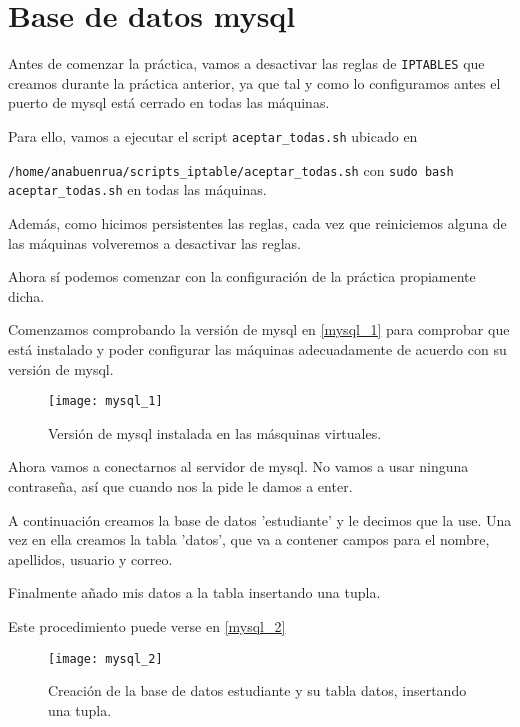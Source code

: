 
\chapter{Base de datos mysql}

Antes de comenzar la práctica, vamos a desactivar las reglas de \verb|IPTABLES| que creamos durante la práctica anterior, ya que tal y como lo configuramos antes el puerto de mysql está cerrado en todas las máquinas.

Para ello, vamos a ejecutar el script \verb|aceptar_todas.sh| ubicado en 

\verb|/home/anabuenrua/scripts_iptable/aceptar_todas.sh| con \verb|sudo bash aceptar_todas.sh| en todas las máquinas.

Además, como hicimos persistentes las reglas, cada vez que reiniciemos alguna de las máquinas volveremos a desactivar las reglas.

Ahora sí podemos comenzar con la configuración de la práctica propiamente dicha.

Comenzamos comprobando la versión de mysql en \eqref{mysql_1} para comprobar que está instalado y poder configurar las máquinas adecuadamente de acuerdo con su versión de mysql.

\begin{figure}[h!]
\begin{center}
\caption{Versión de mysql instalada en las másquinas virtuales.}
\label{mysql_1}
\texttt{[image: mysql\_1]}
\end{center}
\end{figure}

Ahora vamos a conectarnos al servidor de mysql. No vamos a usar ninguna contraseña, así que cuando nos la pide le damos a enter.

A continuación creamos la base de datos 'estudiante' y le decimos que la use. Una vez en ella creamos la tabla 'datos', que va a contener campos para el nombre, apellidos, usuario y correo.

Finalmente añado mis datos a la tabla insertando una tupla.

Este procedimiento puede verse en \eqref{mysql_2}

\begin{figure}[h!]
\begin{center}
\caption{Creación de la base de datos estudiante y su tabla datos, insertando una tupla.}
\label{mysql_2}
\texttt{[image: mysql\_2]}
\end{center}
\end{figure}


